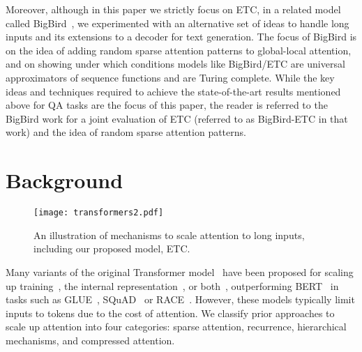 \documentclass[11pt,a4paper]{article}
\begin{document}
Moreover, although in this paper we strictly focus on ETC, in a related model called BigBird~\cite{zaheer2020big}, we experimented with an alternative set of ideas to handle long inputs and its extensions to a decoder for text generation. The focus of BigBird is on the idea of adding random sparse attention patterns to global-local attention, and on showing under which conditions models like BigBird/ETC are universal approximators of sequence functions and are Turing complete. While the key ideas and techniques required to achieve the state-of-the-art results mentioned above for QA tasks are the focus of this paper, the reader is referred to the BigBird work for a joint evaluation of ETC (referred to as BigBird-ETC in that work) and the idea of random sparse attention patterns.




\section{Background}\label{sec:background}

\begin{figure*}[t!]
	\texttt{[image: transformers2.pdf]}
	\centering
	\caption{An illustration of mechanisms to scale attention to long inputs, including our proposed model, ETC.}
	\label{fig:attention-mechanisms}
\end{figure*}





Many variants of the original Transformer model~\cite{vaswani2017attention} have been proposed for scaling up training~\citep[RoBERTa,][]{liu2019roberta}, the internal representation~\citep[ALBERT,][]{lan2019albert}, or both~\cite[T5,][]{raffel2019exploring}, outperforming BERT~\cite{devlin2018bert} in tasks such as GLUE~\cite{wang2018glue}, SQuAD~\cite{rajpurkar2016squad} or RACE~\cite{lai2017race}. However, these models typically limit inputs to  tokens due to the  cost of attention. We classify prior approaches to scale up attention into four categories: sparse attention, recurrence, hierarchical mechanisms, and compressed attention.
\end{document}
